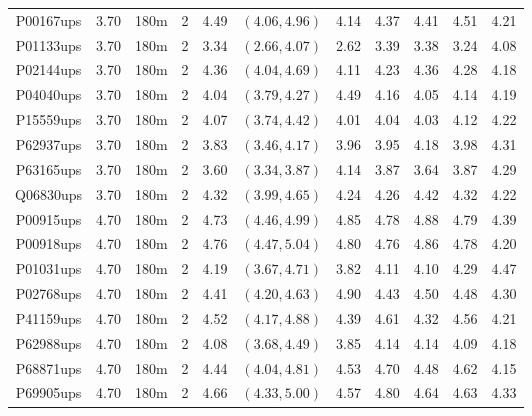 \begin{landscape}
\begin{longtable}{cccc|cc|ccccc}
  P00167ups & 3.70 & 180m &   2 & 4.49 & $(4.06, 4.96)$ & 4.14 & 4.37 & 4.41 & 4.51 & 4.21 \\ 
  P01133ups & 3.70 & 180m &   2 & 3.34 & $(2.66, 4.07)$ & 2.62 & 3.39 & 3.38 & 3.24 & 4.08 \\ 
  P02144ups & 3.70 & 180m &   2 & 4.36 & $(4.04, 4.69)$ & 4.11 & 4.23 & 4.36 & 4.28 & 4.18 \\ 
  P04040ups & 3.70 & 180m &   2 & 4.04 & $(3.79, 4.27)$ & 4.49 & 4.16 & 4.05 & 4.14 & 4.19 \\ 
  P15559ups & 3.70 & 180m &   2 & 4.07 & $(3.74, 4.42)$ & 4.01 & 4.04 & 4.03 & 4.12 & 4.22 \\ 
  P62937ups & 3.70 & 180m &   2 & 3.83 & $(3.46, 4.17)$ & 3.96 & 3.95 & 4.18 & 3.98 & 4.31 \\ 
  P63165ups & 3.70 & 180m &   2 & 3.60 & $(3.34, 3.87)$ & 4.14 & 3.87 & 3.64 & 3.87 & 4.29 \\ 
  Q06830ups & 3.70 & 180m &   2 & 4.32 & $(3.99, 4.65)$ & 4.24 & 4.26 & 4.42 & 4.32 & 4.22 \\ 
  P00915ups & 4.70 & 180m &   2 & 4.73 & $(4.46, 4.99)$ & 4.85 & 4.78 & 4.88 & 4.79 & 4.39 \\ 
  P00918ups & 4.70 & 180m &   2 & 4.76 & $(4.47, 5.04)$ & 4.80 & 4.76 & 4.86 & 4.78 & 4.20 \\ 
  P01031ups & 4.70 & 180m &   2 & 4.19 & $(3.67, 4.71)$ & 3.82 & 4.11 & 4.10 & 4.29 & 4.47 \\ 
  P02768ups & 4.70 & 180m &   2 & 4.41 & $(4.20, 4.63)$ & 4.90 & 4.43 & 4.50 & 4.48 & 4.30 \\ 
  P41159ups & 4.70 & 180m &   2 & 4.52 & $(4.17, 4.88)$ & 4.39 & 4.61 & 4.32 & 4.56 & 4.21 \\ 
  P62988ups & 4.70 & 180m &   2 & 4.08 & $(3.68, 4.49)$ & 3.85 & 4.14 & 4.14 & 4.09 & 4.18 \\ 
  P68871ups & 4.70 & 180m &   2 & 4.44 & $(4.04, 4.81)$ & 4.53 & 4.70 & 4.48 & 4.62 & 4.15 \\ 
  P69905ups & 4.70 & 180m &   2 & 4.66 & $(4.33, 5.00)$ & 4.57 & 4.80 & 4.64 & 4.63 & 4.33 \\ 
   \hline
\end{longtable}
\end{landscape}
\clearpage


